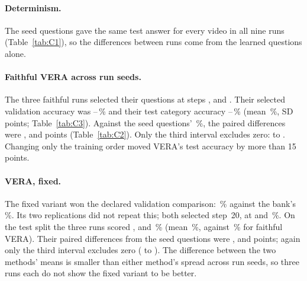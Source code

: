 \paragraph{Determinism.} The seed questions gave the same test answer for every video in all nine runs (Table~\ref{tab:C1}), so the differences between runs come from the learned questions alone.

\paragraph{Faithful VERA across run seeds.} The three faithful runs selected their questions at steps ,  and . Their selected validation accuracy was --\,\% and their test category accuracy --\,\% (mean \,\%, SD  points; Table~\ref{tab:C3}). Against the seed questions' \,\%, the paired differences were ,  and  points (Table~\ref{tab:C2}). Only the third interval excludes zero:  to . Changing only the training order moved VERA's test accuracy by more than 15 points.

\paragraph{VERA, fixed.} The fixed variant won the declared validation comparison: \,\% against the bank's \,\%. Its two replications did not repeat this; both selected step~20, at  and \,\%. On the test split the three runs scored ,  and \,\% (mean \,\%, against \,\% for faithful VERA). Their paired differences from the seed questions were ,  and  points; again only the third interval excludes zero ( to ). The difference between the two methods' means is smaller than either method's spread across run seeds, so three runs each do not show the fixed variant to be better.

